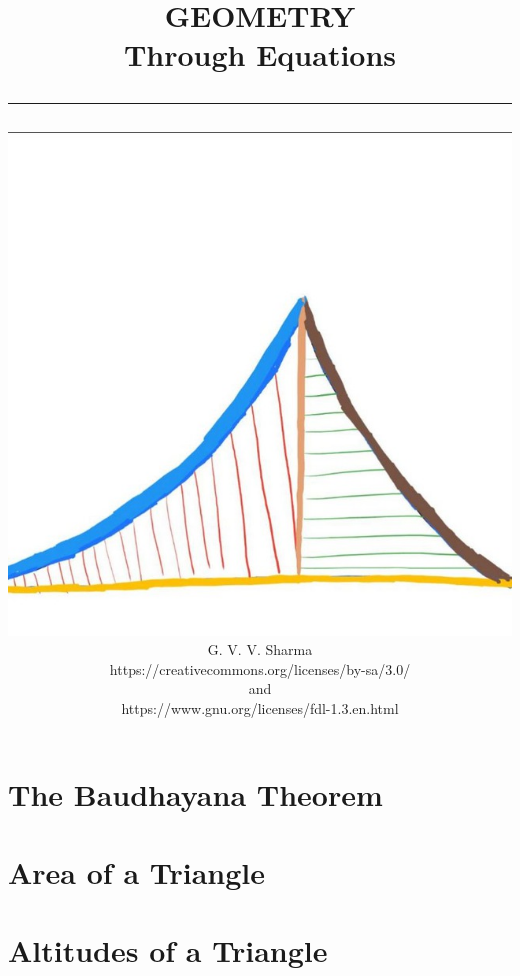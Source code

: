 \documentclass[journal]{IEEEtran}
\begin{document}

\onecolumn


\title{
	\begin{flushleft}
	GEOMETRY \\ Through Equations
	\\
\rule{0.4\columnwidth}{0.4pt}
\end{flushleft}
}
\author{
\vspace{7cm}
	\begin{flushleft}
\includegraphics[width=0.2\columnwidth]{figs/logo.jpg}
\\
		{	\huge G. V. V. Sharma}
		\\
\vspace{1cm}
https://creativecommons.org/licenses/by-sa/3.0/
\\
and
\\
https://www.gnu.org/licenses/fdl-1.3.en.html
	\end{flushleft}
}
\maketitle

\newpage


\tableofcontents

\newpage
\twocolumn


\renewcommand{\thetable}{\theenumi}
\renewcommand{\theequation}{\theenumi}


\section{The Baudhayana Theorem}

\section{Area of a Triangle}

\section{Altitudes of a Triangle}

\end{document}
